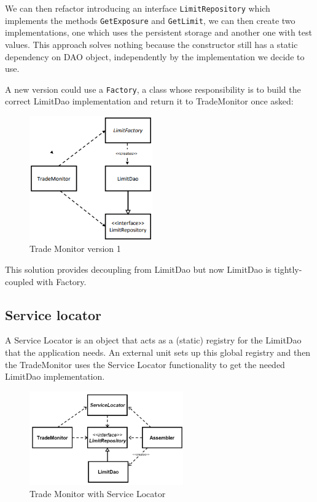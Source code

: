We can then refactor introducing an interface \verb|LimitRepository| which implements the methods \verb|GetExposure| and \verb|GetLimit|, we can then create two implementations, one which uses the persistent storage and another one with test values.
This approach solves nothing because the constructor still has a static dependency on DAO object, independently by the implementation we decide to use.

A new version could use a \verb|Factory|, a class whose responsibility is to build the correct LimitDao implementation and return it to TradeMonitor once asked:
\begin{figure}[H]
    \centering
    \includegraphics[width=200px]{images/9_Frameworks/trade_monitor_1.png}
    \caption{Trade Monitor version 1}
\end{figure}
This solution provides decoupling from LimitDao but now LimitDao is tightly-coupled with Factory.

\subsection{Service locator}
A Service Locator is an object that acts as a (static) registry for the LimitDao that the application needs.
An external unit sets up this global registry and then the TradeMonitor uses the Service Locator functionality to get the needed LimitDao implementation.
\begin{figure}[H]
    \centering
    \includegraphics[width=250px]{images/9_Frameworks/trade_monitor_service_locator.png}
    \caption{Trade Monitor with Service Locator}
\end{figure}

